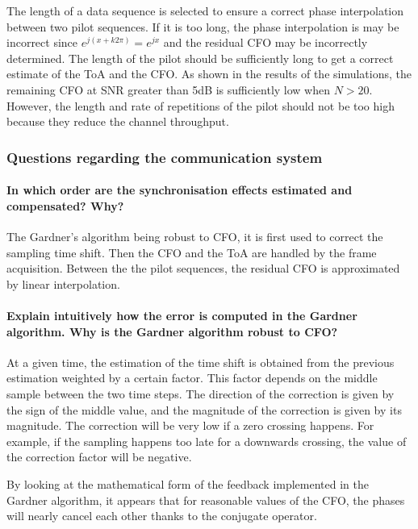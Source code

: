 The length of a data sequence is selected to ensure a correct phase interpolation between two pilot sequences. If it is too long, the phase interpolation is may be incorrect since $e^{j (x+ k 2 \pi)} = e^{j x}$ and the residual CFO may be incorrectly determined. 
The length of the pilot should be sufficiently long to get a correct estimate of the ToA and the CFO. As shown in the results of the simulations, the remaining CFO at SNR greater than \si{5}{dB} is sufficiently low when $N>20$. However, the length and rate of repetitions of the pilot should not be too high because they reduce the channel throughput.

\subsubsection{Questions regarding the communication system}

\paragraph{In which order are the synchronisation effects estimated and compensated? Why?} \mbox{}

The Gardner's algorithm being robust to CFO, it is first used to correct the sampling time shift. Then the CFO and the ToA are handled by the frame acquisition. Between the the pilot sequences, the residual CFO is approximated by linear interpolation.

\paragraph{Explain intuitively how the error is computed in the Gardner algorithm. Why is the Gardner algorithm robust to CFO?} \mbox{}

At a given time, the estimation of the time shift is obtained from the previous estimation weighted by a certain factor. This factor depends on the middle sample between the two time steps. The direction of the correction is given by the sign of the middle value, and the magnitude of the correction is given by its magnitude. The correction will be very low if a zero crossing happens. For example, if the sampling happens too late for a downwards crossing, the value of the correction factor will be negative.

By looking at the mathematical form of the feedback implemented in the Gardner algorithm, it appears that for reasonable values of the CFO, the phases will nearly cancel each other thanks to the conjugate operator.

